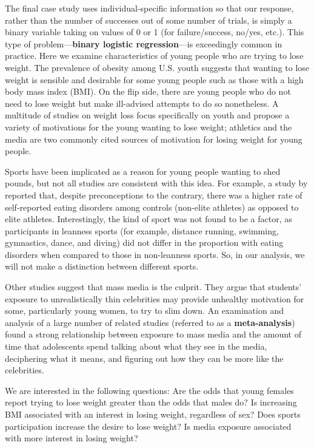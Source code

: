 \documentclass[
]{krantz}
\begin{document}
The final case study uses individual-specific information so that our response, rather than the number of successes out of some number of trials, is simply a binary variable taking on values of 0 or 1 (for failure/success, no/yes, etc.). This type of problem---\textbf{binary logistic regression}---is exceedingly common in practice.  Here we examine characteristics of young people who are trying to lose weight. The prevalence of obesity among U.S. youth suggests that wanting to lose weight is sensible and desirable for some young people such as those with a high body mass index (BMI). On the flip side, there are young people who do not need to lose weight but make ill-advised attempts to do so nonetheless. A multitude of studies on weight loss focus specifically on youth and propose a variety of motivations for the young wanting to lose weight; athletics and the media are two commonly cited sources of motivation for losing weight for young people.

Sports have been implicated as a reason for young people wanting to shed pounds, but not all studies are consistent with this idea. For example, a study by \citet{Martinsen2009} reported that, despite preconceptions to the contrary, there was a higher rate of self-reported eating disorders among controls (non-elite athletes) as opposed to elite athletes. Interestingly, the kind of sport was not found to be a factor, as participants in leanness sports (for example, distance running, swimming, gymnastics, dance, and diving) did not differ in the proportion with eating disorders when compared to those in non-leanness sports. So, in our analysis, we will not make a distinction between different sports.

Other studies suggest that mass media is the culprit. They argue that students' exposure to unrealistically thin celebrities may provide unhealthy motivation for some, particularly young women, to try to slim down. An examination and analysis of a large number of related studies (referred to as a \textbf{meta-analysis}) \citep{Grabe2008} found a strong relationship between exposure to mass media and the amount of time that adolescents spend talking about what they see in the media, deciphering what it means, and figuring out how they can be more like the celebrities.

We are interested in the following questions: Are the odds that young females report trying to lose weight greater than the odds that males do? Is increasing BMI associated with an interest in losing weight, regardless of sex? Does sports participation increase the desire to lose weight? Is media exposure associated with more interest in losing weight?
\end{document}
